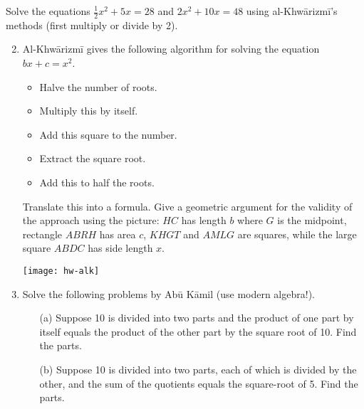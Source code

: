 \begin{exercises}{}{}
	\exstart %
	Solve the equations $\frac 12x^2+5x=28$ and $2x^2+10x=48$ using al-Khwārizmī's methods (first multiply or divide by 2).
	  
	\begin{enumerate}\setcounter{enumi}{1}
	  \item%
	  \label{exs:alkalgebra}
	  Al-Khwārizmī gives the following algorithm for solving the equation $bx+c=x^2$.\\
	  \begin{minipage}[t]{0.6\linewidth}\vspace{0pt}
	  \begin{itemize}\itemsep0pt
	    \item Halve the number of roots.
	    \item Multiply this by itself.
	    \item Add this square to the number.
	    \item Extract the square root.
	    \item Add this to half the roots.
	  \end{itemize}
	  Translate this into a formula. Give a geometric argument for the validity of the approach using the picture: $HC$ has length $b$ where $G$ is the midpoint, rectangle $ABRH$ has area $c$, $KHGT$ and $AMLG$ are squares, while the large square $ABDC$ has side length $x$.
	  \end{minipage}
	  \hfill
	  \begin{minipage}[t]{0.39\linewidth}\vspace{0pt}
	  	\flushright
	  	\texttt{[image: hw-alk]}
	  \end{minipage}
	  
	  
	  \item%
	  Solve the following problems by Abū Kāmil (use modern algebra!).
	  \begin{itemize}
	    \item[(a)] Suppose 10 is divided into two parts and the product of one part by itself equals the product of the other part by the square root of 10. Find the parts.
	    \item[(b)] Suppose 10 is divided into two parts, each of which is divided by the other, and the sum of the quotients equals the square-root of 5. Find the parts.
	  \end{itemize}
	\end{enumerate}
\end{exercises}


